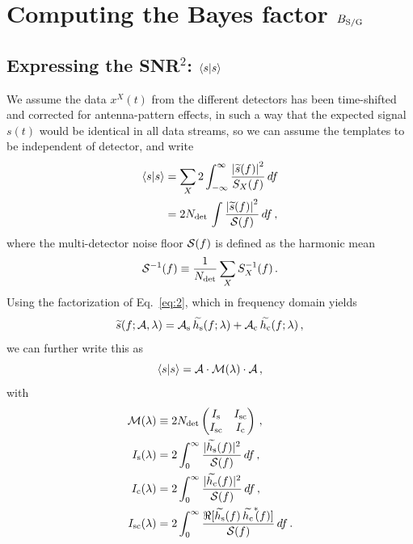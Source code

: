 \documentclass[aps,prd,onecolumn,notitlepage,nofootinbib,superscriptaddress,altaffilletter,floatfix]{revtex4-1}
\begin{document}
\section{Computing the Bayes factor $B_{\mathrm{S/G}}$}
\label{sec:comp-bayes-fact}

\subsection{Expressing the SNR$^2$: $\left\langle s\middle|s\right\rangle$}
\label{sec:computing-scalarss}

We assume the data $x^X(t)$ from the different detectors has been time-shifted and corrected for antenna-pattern effects, in such a way that the
expected signal $s(t)$ would be identical in all data streams, so we can assume the templates to be independent of detector, and write
\begin{align}
  \label{eq:15}
  \left\langle s\middle|s\right\rangle &= \sum_X 2\int_{-\infty}^{\infty} \frac{\left| \widetilde{s}(f) \right|^2}{S_X(f)}\,df\\
  &= 2N_{\mathrm{det}}\,\int \frac{\left| \widetilde{s}(f) \right|^2}{\mathcal{S}(f)}\,df\,,
\end{align}
where the multi-detector noise floor $\mathcal{S}(f)$ is defined as the harmonic mean
\begin{equation}
  \label{eq:26}
  \mathcal{S}^{-1}(f) \equiv \frac{1}{N_{\mathrm{det}}}\sum_X S_X^{-1}(f)\,.
\end{equation}
Using the factorization of Eq.~\eqref{eq:2}, which in frequency domain yields
\begin{equation}
  \label{eq:34}
  \widetilde{s}(f;{\mathcal A},\lambda) = {\mathcal A}_{\mathrm{s}}\,\widetilde{h_\mathrm{s}}(f;\lambda) + {\mathcal A}_{\mathrm{c}}\,\widetilde{h_\mathrm{c}}(f;\lambda)\,,
\end{equation}
we can further write this as
\begin{equation}
  \label{eq:36}
  \left\langle s\middle|s\right\rangle = {\mathcal A} \cdot \mathcal{M}(\lambda) \cdot {\mathcal A}\,,
\end{equation}
with
\begin{align}
  \label{eq:35}
  \mathcal{M}(\lambda) &\equiv
  2N_{\mathrm{det}} \begin{pmatrix}
    I_{\mathrm{s}}  & I_{\mathrm{sc}} \\
    I_{\mathrm{sc}}  & I_{\mathrm{c}}\\
  \end{pmatrix}\,,\\
  I_{\mathrm{s}}(\lambda) &= 2 \int_{0}^{\infty} \frac{|\widetilde{h_\mathrm{s}}(f)|^2}{\mathcal{S}(f)}\,df \,,\\
  I_{\mathrm{c}}(\lambda) &= 2 \int_{0}^{\infty} \frac{|\widetilde{h_\mathrm{c}}(f)|^2}{\mathcal{S}(f)}\,df \,,\\
  I_{\mathrm{sc}}(\lambda)&= 2 \int_{0}^{\infty} \frac{\Re[\widetilde{h_\mathrm{s}}(f)\,\widetilde{h_\mathrm{c}}^{*}\!\!(f)]}{\mathcal{S}(f)}\,df \,.
\end{align}
\end{document}
